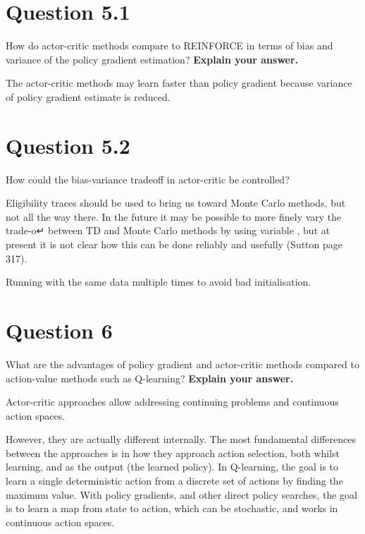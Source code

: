 \documentclass[12pt]{article}
\begin{document}
\section*{Question 5.1}

How do actor-critic methods compare to REINFORCE in terms of
bias and variance of the policy gradient estimation? \textbf{Explain your answer.}
\newline

The actor-critic methods may learn faster than policy gradient because
variance of policy gradient estimate is reduced.


\section*{Question 5.2}

How could the bias-variance tradeoff in actor-critic be controlled?
\newline

Eligibility traces should be used to bring us toward Monte
Carlo methods, but not all the way there. In the future it may be possible to more finely
vary the trade-o↵ between TD and Monte Carlo methods by using variable , but at
present it is not clear how this can be done reliably and usefully (Sutton page 317).

Running with the same data multiple times to avoid bad initialisation.
 

\section*{Question 6}

What are the advantages of policy gradient and actor-critic methods
compared to action-value methods such as Q-learning? \textbf{Explain your answer.}
\newline

Actor-critic approaches allow addressing continuing
problems and continuous action spaces. 
\newline

However, they are actually different internally. The most fundamental differences between the approaches is in how they approach action selection, both whilst learning, and as the output (the learned policy). In Q-learning, the goal is to learn a single deterministic action from a discrete set of actions by finding the maximum value. With policy gradients, and other direct policy searches, the goal is to learn a map from state to action, which can be stochastic, and works in continuous action spaces.
\newline
\end{document}
